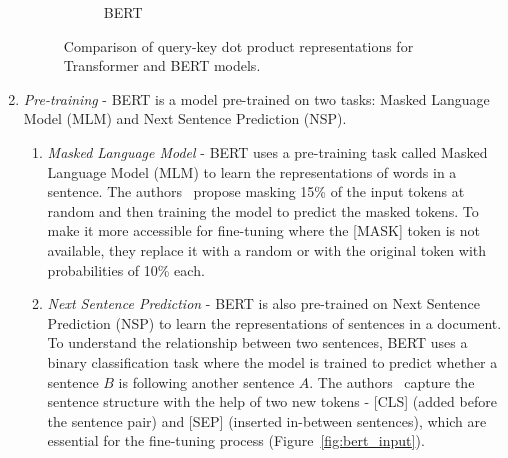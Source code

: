 \begin{enumerate}
\begin{figure}[h]
\begin{subfigure}{0.45\textwidth}
        \end{subfigure}
        \hfill
        \begin{subfigure}{0.45\textwidth}
            \centering
            \caption{BERT}
            \label{fig:bert_grid}
        \end{subfigure}
        \caption{Comparison of query-key dot product representations for Transformer and BERT models.}
        \label{fig:grid_comparison}
    \end{figure}
    \item \emph{Pre-training} - BERT is a model pre-trained on two tasks: Masked Language Model (MLM) and Next Sentence Prediction (NSP).
    \begin{enumerate}
        \item \emph{Masked Language Model} - BERT uses a pre-training task called Masked Language Model (MLM) to learn the representations of words in a sentence.
        The authors~\cite{devlin-etal-2019-bert} propose masking 15\% of the input tokens at random and then training the model to predict the masked tokens.
        To make it more accessible for fine-tuning where the [MASK] token is not available, they replace it with a random or with the original token with probabilities of 10\% each.
        \item \emph{Next Sentence Prediction} - BERT is also pre-trained on Next Sentence Prediction (NSP) to learn the representations of sentences in a document.
        To understand the relationship between two sentences, BERT uses a binary classification task where the model is trained to predict whether a sentence $B$ is following another sentence $A$.
        The authors~\cite{devlin-etal-2019-bert} capture the sentence structure with the help of two new tokens - [CLS] (added before the sentence pair) and [SEP] (inserted in-between sentences), which are essential for the fine-tuning process (Figure~\ref{fig:bert_input}).

\end{enumerate}
\end{enumerate}
